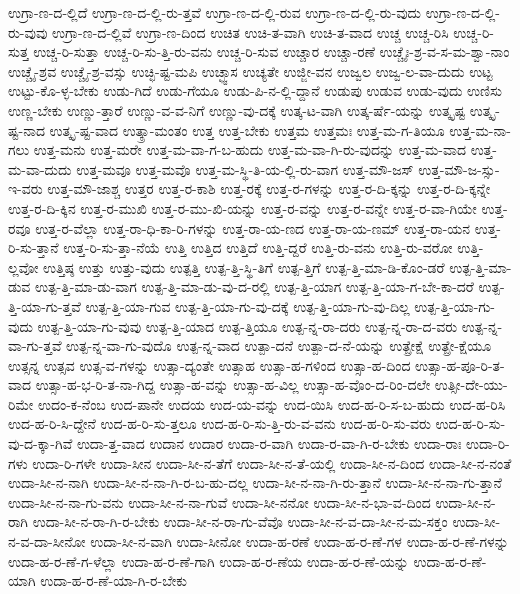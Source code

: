 {ಉಗ್ರಾ-ಣ-ದ-ಲ್ಲಿದೆ
ಉಗ್ರಾ-ಣ-ದ-ಲ್ಲಿ-ರು-ತ್ತವೆ
ಉಗ್ರಾ-ಣ-ದ-ಲ್ಲಿ-ರುವ
ಉಗ್ರಾ-ಣ-ದ-ಲ್ಲಿ-ರು-ವುದು
ಉಗ್ರಾ-ಣ-ದ-ಲ್ಲಿ-ರು-ವುವು
ಉಗ್ರಾ-ಣ-ದ-ಲ್ಲಿವೆ
ಉಗ್ರಾ-ಣ-ದಿಂದ
ಉಚಿತ
ಉಚಿ-ತ-ವಾಗಿ
ಉಚಿ-ತ-ವಾದ
ಉಚ್ಚ
ಉಚ್ಚ-ರಿಸಿ
ಉಚ್ಚ-ರಿ-ಸುತ್ತ
ಉಚ್ಚ-ರಿ-ಸುತ್ತಾ
ಉಚ್ಚ-ರಿ-ಸು-ತ್ತಿ-ರು-ವನು
ಉಚ್ಚ-ರಿ-ಸುವ
ಉಚ್ಚಾರ
ಉಚ್ಚಾ-ರಣೆ
ಉಚ್ಚೈಃ-ಶ್ರ-ವ-ಸ-ಮ-ಶ್ವಾ-ನಾಂ
ಉಚ್ಚೈ-ಶ್ರವ
ಉಚ್ಚೈ-ಶ್ರ-ವಸ್ಸು
ಉಚ್ಛಿ-ಷ್ಟ-ಮಪಿ
ಉಚ್ಛ್ವಾಸ
ಉಚ್ಯತೇ
ಉಜ್ಜೀ-ವನ
ಉಜ್ವಲ
ಉಜ್ವ-ಲ-ವಾ-ದುದು
ಉಟ್ಟ
ಉಟ್ಟು-ಕೊ-ಳ್ಳ-ಬೇಕು
ಉಡು-ಗಿದೆ
ಉಡು-ಗೆಯೂ
ಉಡು-ಪಿ-ನ-ಲ್ಲಿ-ದ್ದಾನೆ
ಉಡುಪು
ಉಡುವ
ಉಡು-ವುದು
ಉಣಿಸು
ಉಣ್ಣ-ಬೇಕು
ಉಣ್ಣು-ತ್ತಾರೆ
ಉಣ್ಣು-ವ-ವ-ನಿಗೆ
ಉಣ್ಣು-ವು-ದಕ್ಕೆ
ಉತ್ಕ-ಟ-ವಾಗಿ
ಉತ್ಕ-ರ್ಷೆ-ಯನ್ನು
ಉತ್ಕೃಷ್ಟ
ಉತ್ಕೃ-ಷ್ಟ-ನಾದ
ಉತ್ಕೃ-ಷ್ಟ-ವಾದ
ಉತ್ಕ್ರಾ-ಮಂತಂ
ಉತ್ತ
ಉತ್ತ-ಬೇಕು
ಉತ್ತಮ
ಉತ್ತಮಃ
ಉತ್ತ-ಮ-ಗ-ತಿಯೂ
ಉತ್ತ-ಮ-ನಾ-ಗಲು
ಉತ್ತ-ಮನು
ಉತ್ತ-ಮರೇ
ಉತ್ತ-ಮ-ವಾ-ಗ-ಬ-ಹುದು
ಉತ್ತ-ಮ-ವಾ-ಗಿ-ರು-ವುದನ್ನು
ಉತ್ತ-ಮ-ವಾದ
ಉತ್ತ-ಮ-ವಾ-ದುದು
ಉತ್ತ-ಮವೂ
ಉತ್ತ-ಮವೊ
ಉತ್ತ-ಮ-ಸ್ಥಿ-ತಿ-ಯ-ಲ್ಲಿ-ರು-ವಾಗ
ಉತ್ತ-ಮೌ-ಜಸ್
ಉತ್ತ-ಮೌ-ಜ-ಸ್ಸು-ಇ-ವರು
ಉತ್ತ-ಮೌ-ಜಾಶ್ಚ
ಉತ್ತರ
ಉತ್ತ-ರ-ಕಾಶಿ
ಉತ್ತ-ರಕ್ಕೆ
ಉತ್ತ-ರ-ಗಳನ್ನು
ಉತ್ತ-ರ-ದಿ-ಕ್ಕನ್ನು
ಉತ್ತ-ರ-ದಿ-ಕ್ಕನ್ನೇ
ಉತ್ತ-ರ-ದಿ-ಕ್ಕಿನ
ಉತ್ತ-ರ-ಮುಖಿ
ಉತ್ತ-ರ-ಮು-ಖಿ-ಯನ್ನು
ಉತ್ತ-ರ-ವನ್ನು
ಉತ್ತ-ರ-ವನ್ನೇ
ಉತ್ತ-ರ-ವಾ-ಗಿಯೇ
ಉತ್ತ-ರವೂ
ಉತ್ತ-ರ-ವೆಲ್ಲಾ
ಉತ್ತ-ರಾ-ಧಿ-ಕಾ-ರಿ-ಗಳನ್ನು
ಉತ್ತ-ರಾ-ಯ-ಣದ
ಉತ್ತ-ರಾ-ಯ-ಣಮ್
ಉತ್ತ-ರಾ-ಯನ
ಉತ್ತ-ರಿ-ಸು-ತ್ತಾನೆ
ಉತ್ತ-ರಿ-ಸು-ತ್ತಾ-ನೆಯೆ
ಉತ್ತಿ
ಉತ್ತಿದ
ಉತ್ತಿದೆ
ಉತ್ತಿ-ದ್ದರೆ
ಉತ್ತಿ-ರು-ವನು
ಉತ್ತಿ-ರು-ವರೋ
ಉತ್ತಿ-ಲ್ಲವೋ
ಉತ್ತಿಷ್ಠ
ಉತ್ತು
ಉತ್ತು-ವುದು
ಉತ್ಪತ್ತಿ
ಉತ್ಪ-ತ್ತಿ-ಸ್ಥಿ-ತಿಗೆ
ಉತ್ಪ-ತ್ತಿಗೆ
ಉತ್ಪ-ತ್ತಿ-ಮಾ-ಡಿ-ಕೊಂ-ಡರೆ
ಉತ್ಪ-ತ್ತಿ-ಮಾ-ಡುವ
ಉತ್ಪ-ತ್ತಿ-ಮಾ-ಡು-ವಾಗ
ಉತ್ಪ-ತ್ತಿ-ಮಾ-ಡು-ವು-ದ-ರಲ್ಲಿ
ಉತ್ಪ-ತ್ತಿ-ಯಾಗ
ಉತ್ಪ-ತ್ತಿ-ಯಾ-ಗ-ಬೇ-ಕಾ-ದರೆ
ಉತ್ಪ-ತ್ತಿ-ಯಾ-ಗು-ತ್ತವೆ
ಉತ್ಪ-ತ್ತಿ-ಯಾ-ಗುವ
ಉತ್ಪ-ತ್ತಿ-ಯಾ-ಗು-ವು-ದಕ್ಕೆ
ಉತ್ಪ-ತ್ತಿ-ಯಾ-ಗು-ವು-ದಿಲ್ಲ
ಉತ್ಪ-ತ್ತಿ-ಯಾ-ಗು-ವುದು
ಉತ್ಪ-ತ್ತಿ-ಯಾ-ಗು-ವುವು
ಉತ್ಪ-ತ್ತಿ-ಯಾದ
ಉತ್ಪ-ತ್ತಿಯೂ
ಉತ್ಪ-ನ್ನ-ರಾ-ದರು
ಉತ್ಪ-ನ್ನ-ರಾ-ದ-ವರು
ಉತ್ಪ-ನ್ನ-ವಾ-ಗು-ತ್ತವೆ
ಉತ್ಪ-ನ್ನ-ವಾ-ಗು-ವುದೊ
ಉತ್ಪ-ನ್ನ-ವಾದ
ಉತ್ಪಾ-ದನೆ
ಉತ್ಪಾ-ದ-ನೆ-ಯನ್ನು
ಉತ್ಪ್ರೇಕ್ಷೆ
ಉತ್ಪ್ರೇ-ಕ್ಷೆಯೂ
ಉತ್ಸನ್ನ
ಉತ್ಸವ
ಉತ್ಸ-ವ-ಗಳನ್ನು
ಉತ್ಸಾ-ದ್ಯಂತೇ
ಉತ್ಸಾಹ
ಉತ್ಸಾ-ಹ-ಗಳಿಂದ
ಉತ್ಸಾ-ಹ-ದಿಂದ
ಉತ್ಸಾ-ಹ-ಪೂ-ರಿ-ತ-ವಾದ
ಉತ್ಸಾ-ಹ-ಭ-ರಿ-ತ-ನಾ-ಗಿದ್ದ
ಉತ್ಸಾ-ಹ-ವನ್ನು
ಉತ್ಸಾ-ಹ-ವಿಲ್ಲ
ಉತ್ಸಾ-ಹ-ವೊಂ-ದ-ರಿಂ-ದಲೇ
ಉತ್ಸೀ-ದೇ-ಯು-ರಿಮೇ
ಉದಂ-ಕ-ನೆಂಬ
ಉದ-ಪಾನೇ
ಉದಯ
ಉದ-ಯ-ವನ್ನು
ಉದ-ಯಿಸಿ
ಉದ-ಹ-ರಿ-ಸ-ಬ-ಹುದು
ಉದ-ಹ-ರಿಸಿ
ಉದ-ಹ-ರಿ-ಸಿ-ದ್ದೇನೆ
ಉದ-ಹ-ರಿ-ಸು-ತ್ತಲೂ
ಉದ-ಹ-ರಿ-ಸು-ತ್ತಿ-ರು-ವ-ವನು
ಉದ-ಹ-ರಿ-ಸು-ವರು
ಉದ-ಹ-ರಿ-ಸು-ವು-ದ-ಕ್ಕಾ-ಗಿವೆ
ಉದಾ-ತ್ತ-ವಾದ
ಉದಾನ
ಉದಾರ
ಉದಾ-ರ-ವಾಗಿ
ಉದಾ-ರ-ವಾ-ಗಿ-ರ-ಬೇಕು
ಉದಾ-ರಾಃ
ಉದಾ-ರಿ-ಗಳು
ಉದಾ-ರಿ-ಗಳೇ
ಉದಾ-ಸೀನ
ಉದಾ-ಸೀ-ನ-ತೆಗೆ
ಉದಾ-ಸೀ-ನ-ತೆ-ಯಲ್ಲಿ
ಉದಾ-ಸೀ-ನ-ದಿಂದ
ಉದಾ-ಸೀ-ನ-ನಂತೆ
ಉದಾ-ಸೀ-ನ-ನಾಗಿ
ಉದಾ-ಸೀ-ನ-ನಾ-ಗಿ-ರ-ಬ-ಹು-ದಲ್ಲ
ಉದಾ-ಸೀ-ನ-ನಾ-ಗಿ-ರು-ತ್ತಾನೆ
ಉದಾ-ಸೀ-ನ-ನಾ-ಗು-ತ್ತಾನೆ
ಉದಾ-ಸೀ-ನ-ನಾ-ಗು-ವನು
ಉದಾ-ಸೀ-ನ-ನಾ-ಗುವೆ
ಉದಾ-ಸೀ-ನನೋ
ಉದಾ-ಸೀ-ನ-ಭಾ-ವ-ದಿಂದ
ಉದಾ-ಸೀ-ನ-ರಾಗಿ
ಉದಾ-ಸೀ-ನ-ರಾ-ಗಿ-ರ-ಬೇಕು
ಉದಾ-ಸೀ-ನ-ರಾ-ಗು-ವೆವೊ
ಉದಾ-ಸೀ-ನ-ವ-ದಾ-ಸೀ-ನ-ಮ-ಸಕ್ತಂ
ಉದಾ-ಸೀ-ನ-ವ-ದಾ-ಸೀನೋ
ಉದಾ-ಸೀ-ನ-ವಾಗಿ
ಉದಾ-ಸೀನೋ
ಉದಾ-ಹ-ರಣೆ
ಉದಾ-ಹ-ರ-ಣೆ-ಗಳ
ಉದಾ-ಹ-ರ-ಣೆ-ಗಳನ್ನು
ಉದಾ-ಹ-ರ-ಣೆ-ಗ-ಳೆಲ್ಲಾ
ಉದಾ-ಹ-ರ-ಣೆ-ಗಾಗಿ
ಉದಾ-ಹ-ರ-ಣೆಯ
ಉದಾ-ಹ-ರ-ಣೆ-ಯನ್ನು
ಉದಾ-ಹ-ರ-ಣೆ-ಯಾಗಿ
ಉದಾ-ಹ-ರ-ಣೆ-ಯಾ-ಗಿ-ರ-ಬೇಕು
}
